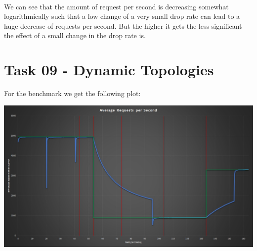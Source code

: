 \documentclass{article}
\begin{document}
\begin{adjustwidth}{2em}{2em}
\begin{center}
		\end{center}
		\hfill \\
		We can see that the amount of request per second is decreasing somewhat logarithmically such that a low change of a very small drop rate can lead to a huge decrease of requests per second. But the higher it gets the less significant the effect of a small change in the drop rate is.
	\end{adjustwidth}
	\newpage
	\section*{Task 09 - Dynamic Topologies}
	\begin{adjustwidth}{2em}{2em}
		For the benchmark we get the following plot:
	\end{adjustwidth}
	\begin{adjustwidth}{-4em}{}
		\begin{center}
			\includegraphics[scale=0.55]{tha_plot.jpg}
		\end{center}
	\end{adjustwidth}
\end{document}
